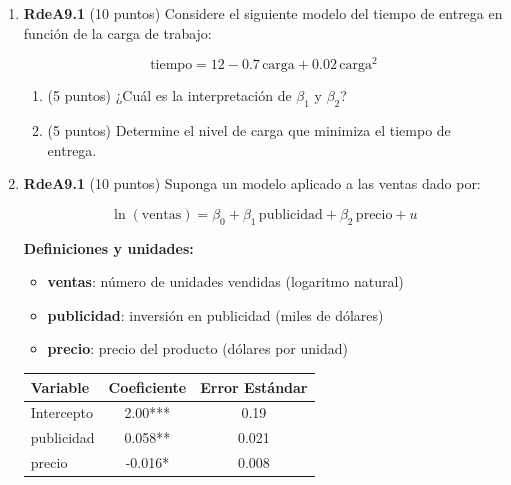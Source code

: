 \documentclass[10pt,a4paper]{article}
\begin{document}
\begin{enumerate}
Debiese incluir las variables \texttt{math4} y \texttt{story4} en la investigación? Sustente su respuesta mediante la formulación y explicación de un test de hipótesis que permita evaluar su relevancia estadística en el modelo ($
F_{0.05, (2, 1841)} \approx 3.00$).
 
 \item \textbf{RdeA9.1} (10 puntos)  
{Considere el siguiente modelo del tiempo de entrega en función de la carga de trabajo:}

\[
\text{tiempo} = 12 - 0.7\,\text{carga} + 0.02\,\text{carga}^2
\]


\begin{enumerate}
    \item (5 puntos) ¿Cuál es la interpretación de $\beta_1$ y $\beta_2$?

    \item (5 puntos) Determine el nivel de carga que minimiza el tiempo de entrega.
\end{enumerate}

 
 \item \textbf{RdeA9.1} (10 puntos)  
{Suponga un modelo aplicado a las ventas dado por:}

\[
\ln(\mathrm{ventas}) = \beta_0 + \beta_1\,\mathrm{publicidad} + \beta_2\,\mathrm{precio} + u
\]

\noindent
\textbf{Definiciones y unidades:}
\begin{itemize}
    \item \textbf{ventas}: número de unidades vendidas (logaritmo natural)
    \item \textbf{publicidad}: inversión en publicidad (miles de dólares)
    \item \textbf{precio}: precio del producto (dólares por unidad)
\end{itemize}

\begin{center}
\begin{tabular}{lcc}
\toprule
\textbf{Variable} & \textbf{Coeficiente} & \textbf{Error Estándar} \\
\midrule
Intercepto   & 2.00***  & 0.19 \\
publicidad   & 0.058**  & 0.021 \\
precio       & -0.016*  & 0.008 \\
\bottomrule
\end{tabular}


\end{center}
\end{enumerate}
\end{document}
